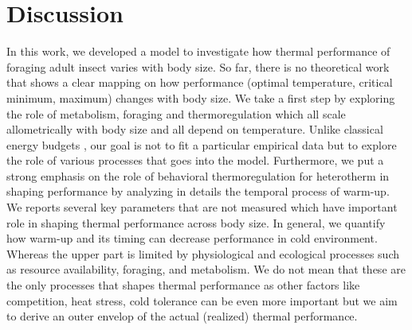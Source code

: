 \section*{Discussion}
In this work, we developed a model to investigate how thermal performance of foraging adult insect varies with body size.
So far, there is no theoretical work that shows a clear mapping on how performance (optimal temperature, critical minimum, maximum) changes with body size. 
We take a first step by exploring the role of metabolism, foraging and thermoregulation which all scale allometrically with body size and all depend on temperature.
Unlike classical energy budgets \citep[e.g.,][]{Kooijman2009}, our goal is not to fit a particular empirical data but to explore the role of various processes that goes into the model.
Furthermore, we put a strong emphasis on the role of behavioral thermoregulation for heterotherm in shaping performance by analyzing in details the temporal process of warm-up.
We reports several key parameters that are not measured which have important role in shaping thermal performance across body size.
In general, we quantify how warm-up and its timing can decrease performance in cold environment.
Whereas the upper part is limited by physiological and ecological processes such as resource availability, foraging, and metabolism.
We do not mean that these are the only processes  that shapes thermal performance as other factors like competition, heat stress, cold tolerance can be even more important but we aim to derive an outer envelop of the actual (realized) thermal performance.%

